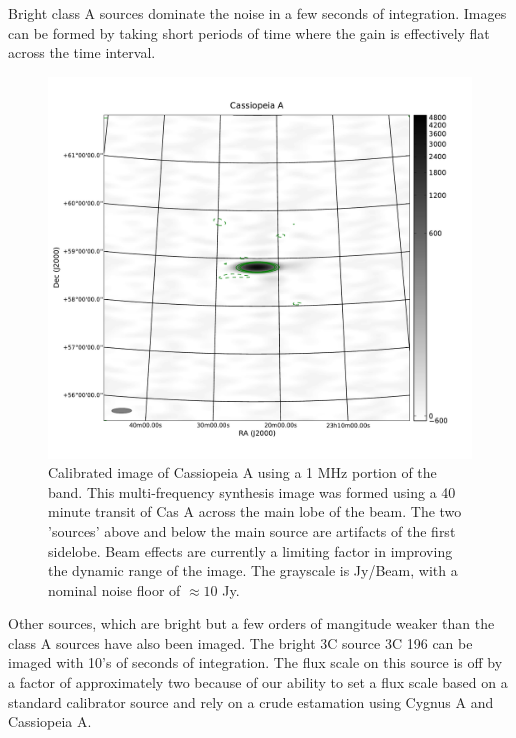 \documentclass[useAMS,macros,usenatbib,onecolumn]{mn2e}
\begin{document}
Bright class A sources dominate the noise in a few seconds of integration.
Images can be formed by taking short periods of time where the gain is effectively flat across the time interval.

\begin{figure}
    \centering
    \includegraphics[scale=0.6]{graphics/cas_1319623663.pdf}
    \caption{Calibrated image of Cassiopeia A using a 1 MHz portion of the band. This multi-frequency synthesis image was formed using a 40 minute transit of Cas A across the main lobe of the beam.
    The two 'sources' above and below the main source are artifacts of the first sidelobe. Beam effects are currently a limiting factor in improving the dynamic range of the image.
    The grayscale is Jy/Beam, with a nominal noise floor of $\approx 10$ Jy.}
    \label{fig:cas_a_corr}
\end{figure}

Other sources, which are bright but a few orders of mangitude weaker than the class A sources have also been imaged.
The bright 3C source 3C 196 can be imaged with 10's of seconds of integration.
The flux scale on this source is off by a factor of approximately two because of our ability to set a flux scale based on a standard calibrator source and rely on a crude estamation using Cygnus A and Cassiopeia A.
\end{document}
